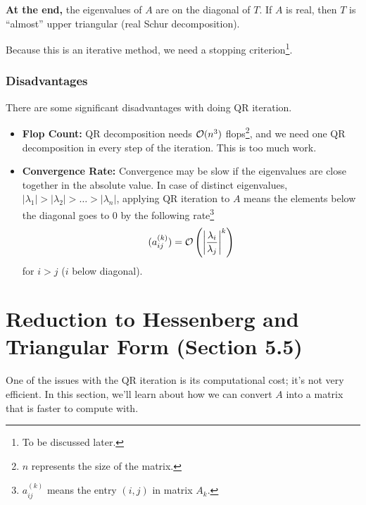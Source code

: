 \documentclass[letterpaper]{article}
\newcommand{\0}{\mathbf{0}}
\begin{document}
\bigskip 

\textbf{At the end,} the eigenvalues of $A$ are on the diagonal of $T$. If $A$ is real, then $T$ is ``almost'' upper triangular (real Schur decomposition). 

\bigskip 

Because this is an iterative method, we need a stopping criterion\footnote{To be discussed later.}.

\subsubsection{Disadvantages}
There are some significant disadvantages with doing QR iteration. 
\begin{itemize}
    \item \textbf{Flop Count:} QR decomposition needs $\mathcal{O}(n^3)$ flops\footnote{$n$ represents the size of the matrix.}, and we need one QR decomposition in every step of the iteration. This is too much work. 
    \item \textbf{Convergence Rate:} Convergence may be slow if the eigenvalues are close together in the absolute value. In case of distinct eigenvalues, $|\lambda_1| > |\lambda_2| > \hdots > |\lambda_n|$, applying QR iteration to $A$ means the elements below the diagonal goes to 0 by the following rate\footnote{$a_{ij}^{(k)}$ means the entry $(i, j)$ in matrix $A_k$.}
    \[(a_{ij}^{(k)}) = \mathcal{O}\left(\left|\frac{\lambda_i}{\lambda_j}\right|^k\right)\] for $i > j$ ($i$ below diagonal). 
\end{itemize}



\section{Reduction to Hessenberg and Triangular Form (Section 5.5)}
One of the issues with the QR iteration is its computational cost; it's not very efficient. In this section, we'll learn about how we can convert $A$ into a matrix that is faster to compute with. 
\end{document}
